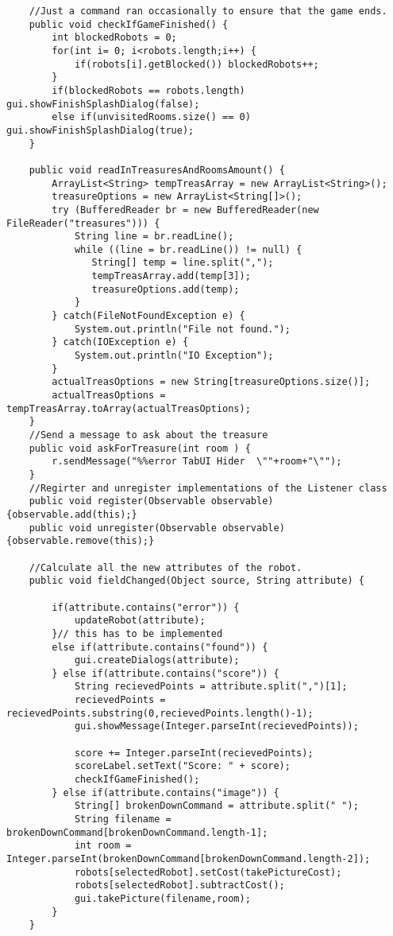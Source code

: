\begin{lstlisting}
	//Just a command ran occasionally to ensure that the game ends.
	public void checkIfGameFinished() {
		int blockedRobots = 0;
		for(int i= 0; i<robots.length;i++) {
			if(robots[i].getBlocked()) blockedRobots++;
		}
		if(blockedRobots == robots.length) gui.showFinishSplashDialog(false);
		else if(unvisitedRooms.size() == 0) gui.showFinishSplashDialog(true);
	}

	public void readInTreasuresAndRoomsAmount() {
		ArrayList<String> tempTreasArray = new ArrayList<String>();
		treasureOptions = new ArrayList<String[]>();
		try (BufferedReader br = new BufferedReader(new FileReader("treasures"))) {
		    String line = br.readLine();
		    while ((line = br.readLine()) != null) {
		       String[] temp = line.split(",");
		       tempTreasArray.add(temp[3]);
		       treasureOptions.add(temp);
		    }
		} catch(FileNotFoundException e) {
			System.out.println("File not found.");
		} catch(IOException e) {
			System.out.println("IO Exception");
		}
		actualTreasOptions = new String[treasureOptions.size()];
		actualTreasOptions = tempTreasArray.toArray(actualTreasOptions);
	}
	//Send a message to ask about the treasure
	public void askForTreasure(int room ) {
		r.sendMessage("%%error TabUI Hider  \""+room+"\"");
	}
	//Regirter and unregister implementations of the Listener class
	public void register(Observable observable) {observable.add(this);}
  	public void unregister(Observable observable) {observable.remove(this);}

  	//Calculate all the new attributes of the robot.
  	public void fieldChanged(Object source, String attribute) {

    	if(attribute.contains("error")) {
    		updateRobot(attribute);
    	}// this has to be implemented
    	else if(attribute.contains("found")) {
    		gui.createDialogs(attribute);
    	} else if(attribute.contains("score")) {
    		String recievedPoints = attribute.split(",")[1];
    		recievedPoints = recievedPoints.substring(0,recievedPoints.length()-1);
    		gui.showMessage(Integer.parseInt(recievedPoints));
    		
    		score += Integer.parseInt(recievedPoints);
    		scoreLabel.setText("Score: " + score);
    		checkIfGameFinished();
    	} else if(attribute.contains("image")) {
    		String[] brokenDownCommand = attribute.split(" ");
    		String filename = brokenDownCommand[brokenDownCommand.length-1];
    		int room = Integer.parseInt(brokenDownCommand[brokenDownCommand.length-2]);
    		robots[selectedRobot].setCost(takePictureCost);
    		robots[selectedRobot].subtractCost();
    		gui.takePicture(filename,room);
    	}
  	}


\end{lstlisting}
